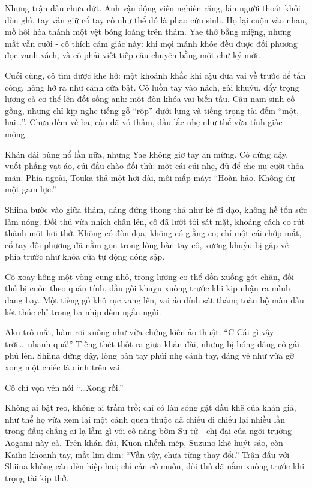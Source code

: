 \documentclass[../main.tex]{subfiles}
\begin{document}
Nhưng trận đấu chưa dứt. Anh vận động viên nghiến răng, lăn người thoát khỏi đòn ghì, tay vẫn giữ cổ tay cô như thể đó là phao cứu sinh. Họ lại cuộn vào nhau, mồ hôi hòa thành một vệt bóng loáng trên thảm. Yae thở bằng miệng, nhưng mắt vẫn cười - cô thích cảm giác này: khi mọi mánh khóe đều được đối phương đọc vanh vách, và cô phải viết tiếp câu chuyện bằng một chữ ký mới.

Cuối cùng, cô tìm được khe hở: một khoảnh khắc khi cậu đưa vai về trước để tấn công, hông hở ra như cánh cửa bật. Cô luồn tay vào nách, gài khuỷu, đẩy trọng lượng cả cơ thể lên đốt sống anh: một đòn khóa vai biến tấu. Cậu nam sinh cố gồng, nhưng chỉ kịp nghe tiếng gỗ ``rộp'' dưới lưng và tiếng trọng tài đếm ``một, hai\dots''. Chưa đếm về ba, cậu đã vỗ thảm, đầu lắc nhẹ như thể vừa tỉnh giấc mộng.

Khán đài bùng nổ lần nữa, nhưng Yae không giơ tay ăn mừng. Cô đứng dậy, vuốt phẳng vạt áo, cúi đầu chào đối thủ: một cái cúi nhẹ, đủ để che nụ cười thỏa mãn. Phía ngoài, Touka thả một hơi dài, môi mấp máy: ``Hoàn hảo. Không dư một gam lực.''

\ct

Shiina bước vào giữa thảm, dáng đứng thong thả như kẻ đi dạo, không hề tốn sức làm nóng. Đối thủ vừa nhích chân lên, cô đã lướt tới sát mặt, khoảng cách co rút thành một hơi thở. Không có đòn dọa, không có giằng co; chỉ một cái chớp mắt, cổ tay đối phương đã nằm gọn trong lòng bàn tay cô, xương khuỷu bị gập về phía trước như khóa cửa tự động đóng sập.

Cô xoay hông một vòng cung nhỏ, trọng lượng cơ thể dồn xuống gót chân, đối thủ bị cuốn theo quán tính, đầu gối khuỵu xuống trước khi kịp nhận ra mình đang bay. Một tiếng gỗ khô rục vang lên, vai áo dính sát thảm; toàn bộ màn đấu kết thúc chỉ trong ba nhịp đếm ngắn ngủi.

Aku trố mắt, hàm rơi xuống như vừa chứng kiến ảo thuật. ``C-Cái gì vậy trời\dots\ nhanh quá!'' Tiếng thét thốt ra giữa khán đài, nhưng bị bóng dáng cô gái phủ lên. Shiina đứng dậy, lòng bàn tay phủi nhẹ cánh tay, dáng vẻ như vừa gỡ xong một chiếc lá dính trên vai.

Cô chỉ vọn vẻn nói ``\dots Xong rồi.''

Không ai bật reo, không ai trầm trồ; chỉ có làn sóng gật đầu khẽ của khán giả, như thể họ vừa xem lại một cảnh quen thuộc đã chiếu đi chiếu lại nhiều lần trong đầu; chẳng ai lạ lẫm gì với cô nàng bờm Sư tử - chị đại của ngôi trường Aogami này cả. Trên khán đài, Kuon nhếch mép, Suzuno khẽ huýt sáo, còn Kaiho khoanh tay, mắt lim dim: ``Vẫn vậy, chưa từng thay đổi.'' Trận đấu với Shiina không cần đến hiệp hai; chỉ cần cô muốn, đối thủ đã nằm xuống trước khi trọng tài kịp thở.
\end{document}
